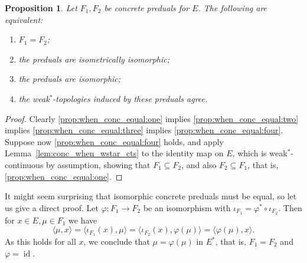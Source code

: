 \documentclass[a4paper,11pt]{article}
\theoremstyle{plain}
\newtheorem{proposition}{Proposition}[section]
\theoremstyle{remark}
\newenvironment{remark}
  {\pushQED{\qed}\renewcommand{\qedsymbol}{$\triangle$}\remarkx}
  {\popQED\endremarkx}
\newcommand{\ip}[2]{{\langle {#1} , {#2} \rangle}}
\newcommand{\id}{\operatorname{id}}
\begin{document}
\begin{proposition}\label{prop:when_conc_equal}
Let $F_1, F_2$ be concrete preduals for $E$.  The following are equivalent:
\begin{enumerate}[(1)]
  \item\label{prop:when_conc_equal:one} $F_1 = F_2$;
  \item\label{prop:when_conc_equal:two} the preduals are isometrically isomorphic;
  \item\label{prop:when_conc_equal:three} the preduals are isomorphic;
  \item\label{prop:when_conc_equal:four} the weak$^*$-topologies induced by these preduals agree.
\end{enumerate}
\end{proposition}
\begin{proof}
Clearly \ref{prop:when_conc_equal:one} implies \ref{prop:when_conc_equal:two} implies \ref{prop:when_conc_equal:three} implies \ref{prop:when_conc_equal:four}.
Suppose now \ref{prop:when_conc_equal:four} holds, and apply Lemma~\ref{lem:conc_when_wstar_cts} to the identity map on $E$, which is weak$^*$-continuous by assumption, showing that $F_1 \subseteq F_2$, and also $F_2 \subseteq F_1$, that is, \ref{prop:when_conc_equal:one}.
\end{proof}

\begin{remark}
It might seem surprising that isomorphic concrete preduals must be equal, so let us give a direct proof.  Let $\varphi \colon F_1 \to F_2$ be an isomorphism with $\iota_{F_1} = \varphi^*\circ\iota_{F_2}$.  Then for $x\in E, \mu\in F_1$ we have
\[ \ip{\mu}{x} = \ip{\iota_{F_1}(x)}{\mu} = \ip{\iota_{F_2}(x)}{\varphi(\mu)} = \ip{\varphi(\mu)}{x}. \]
As this holds for all $x$, we conclude that $\mu = \varphi(\mu)$ in $E^*$, that is, $F_1=F_2$ and $\varphi = \id$.
\end{remark}
\end{document}
